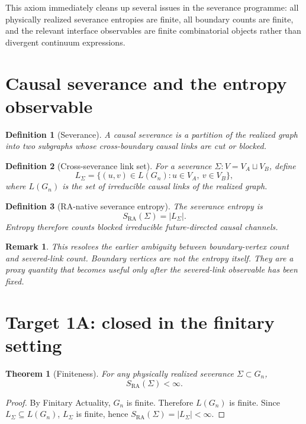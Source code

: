 \documentclass[11pt]{article}
\newtheorem{definition}{Definition}
\newtheorem{theorem}{Theorem}
\newtheorem{remark}{Remark}
\newcommand{\SRa}{S_{\mathrm{RA}}}
\begin{document}
This axiom immediately cleans up several issues in the severance programme: all physically realized severance entropies are finite, all boundary counts are finite, and the relevant interface observables are finite combinatorial objects rather than divergent continuum expressions.

\section{Causal severance and the entropy observable}
\begin{definition}[Severance]
A causal severance is a partition of the realized graph into two subgraphs whose cross-boundary causal links are cut or blocked.
\end{definition}

\begin{definition}[Cross-severance link set]
For a severance $\Sigma:V=V_A\sqcup V_B$, define
\[
L_\Sigma=\{(u,v)\in L(G_n):u\in V_A,\ v\in V_B\},
\]
where $L(G_n)$ is the set of irreducible causal links of the realized graph.
\end{definition}

\begin{definition}[RA-native severance entropy]
The severance entropy is
\[
\SRa(\Sigma)=|L_\Sigma|.
\]
Entropy therefore counts blocked irreducible future-directed causal channels.
\end{definition}

\begin{remark}
This resolves the earlier ambiguity between boundary-vertex count and severed-link count. Boundary vertices are not the entropy itself. They are a proxy quantity that becomes useful only after the severed-link observable has been fixed.
\end{remark}

\section{Target 1A: closed in the finitary setting}
\begin{theorem}[Finiteness]
For any physically realized severance $\Sigma\subset G_n$,
\[
\SRa(\Sigma)<\infty.
\]
\end{theorem}

\begin{proof}
By Finitary Actuality, $G_n$ is finite. Therefore $L(G_n)$ is finite. Since $L_\Sigma\subseteq L(G_n)$, $L_\Sigma$ is finite, hence $\SRa(\Sigma)=|L_\Sigma|<\infty$.
\end{proof}
\end{document}
